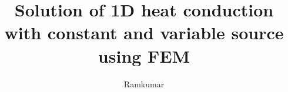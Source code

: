 \documentclass{beamer}
\title{Solution of 1D heat conduction with constant and variable source using FEM}
\author{Ramkumar}
\begin{document}
\frame{\maketitle}


\end{document}
